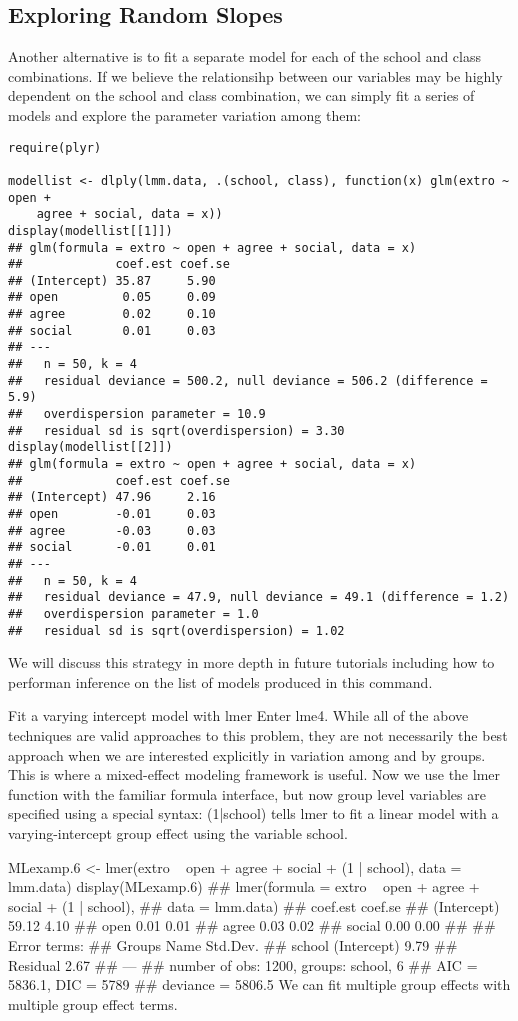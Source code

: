 \subsection{Exploring Random Slopes}
Another alternative is to fit a separate model for each of the school and class combinations. If we believe the relationsihp between our variables may be highly dependent on the school and class combination, we can simply fit a series of models and explore the parameter variation among them:
\begin{framed}
\begin{verbatim}
require(plyr)

modellist <- dlply(lmm.data, .(school, class), function(x) glm(extro ~ open + 
    agree + social, data = x))
display(modellist[[1]])
## glm(formula = extro ~ open + agree + social, data = x)
##             coef.est coef.se
## (Intercept) 35.87     5.90  
## open         0.05     0.09  
## agree        0.02     0.10  
## social       0.01     0.03  
## ---
##   n = 50, k = 4
##   residual deviance = 500.2, null deviance = 506.2 (difference = 5.9)
##   overdispersion parameter = 10.9
##   residual sd is sqrt(overdispersion) = 3.30
display(modellist[[2]])
## glm(formula = extro ~ open + agree + social, data = x)
##             coef.est coef.se
## (Intercept) 47.96     2.16  
## open        -0.01     0.03  
## agree       -0.03     0.03  
## social      -0.01     0.01  
## ---
##   n = 50, k = 4
##   residual deviance = 47.9, null deviance = 49.1 (difference = 1.2)
##   overdispersion parameter = 1.0
##   residual sd is sqrt(overdispersion) = 1.02
\end{verbatim}
\end{framed}
We will discuss this strategy in more depth in future tutorials including how to performan inference on the list of models produced in this command.

Fit a varying intercept model with lmer
Enter lme4. While all of the above techniques are valid approaches to this problem, they are not necessarily the best approach when we are interested explicitly in variation among and by groups. This is where a mixed-effect modeling framework is useful. Now we use the lmer function with the familiar formula interface, but now group level variables are specified using a special syntax: (1|school) tells lmer to fit a linear model with a varying-intercept group effect using the variable school.

MLexamp.6 <- lmer(extro ~ open + agree + social + (1 | school), data = lmm.data)
display(MLexamp.6)
## lmer(formula = extro ~ open + agree + social + (1 | school), 
##     data = lmm.data)
##             coef.est coef.se
## (Intercept) 59.12     4.10  
## open         0.01     0.01  
## agree        0.03     0.02  
## social       0.00     0.00  
## 
## Error terms:
##  Groups   Name        Std.Dev.
##  school   (Intercept) 9.79    
##  Residual             2.67    
## ---
## number of obs: 1200, groups: school, 6
## AIC = 5836.1, DIC = 5789
## deviance = 5806.5
We can fit multiple group effects with multiple group effect terms.

